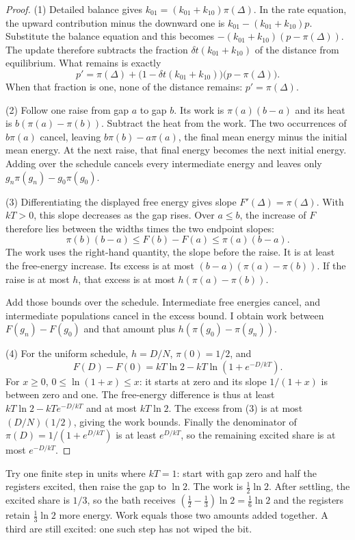 \documentclass[11pt,twoside]{article}
\theoremstyle{thielethm}
\theoremstyle{thieledef}
\theoremstyle{thieledef}
\theoremstyle{thieledef}
\theoremstyle{thielethm}
\theoremstyle{thieleobs}
\theoremstyle{thielethm}
\begin{document}
\begin{proof}
(1) Detailed balance gives
$k_{01}=(k_{01}+k_{10})\pi(\Delta)$. In the rate equation, the upward
contribution minus the downward one is
$k_{01}-(k_{01}+k_{10})p$. Substitute the balance equation and this becomes
$-(k_{01}+k_{10})(p-\pi(\Delta))$. The update therefore subtracts the
fraction $\delta t(k_{01}+k_{10})$ of the distance from equilibrium. What
remains is exactly
\[
 p'=\pi(\Delta)+\bigl(1-\delta t(k_{01}+k_{10})\bigr)
                   \bigl(p-\pi(\Delta)\bigr).
\]
When that fraction is one, none of the distance remains: $p'=\pi(\Delta)$.

(2) Follow one raise from gap $a$ to gap $b$. Its work is
$\pi(a)(b-a)$ and its heat is $b(\pi(a)-\pi(b))$. Subtract the heat from
the work. The two occurrences of $b\pi(a)$ cancel, leaving
$b\pi(b)-a\pi(a)$, the final mean energy minus the initial mean energy.
At the next raise, that final energy becomes the next initial energy.
Adding over the schedule cancels every intermediate energy and leaves
only $g_n\pi(g_n)-g_0\pi(g_0)$.

(3) Differentiating the displayed free energy gives slope $F'(\Delta)=\pi(\Delta)$.
With $kT>0$, this slope decreases as the gap rises. Over $a\le b$, the
increase of $F$ therefore lies between the widths times the two endpoint
slopes:
\[
 \pi(b)(b-a)\le F(b)-F(a)\le\pi(a)(b-a).
\]
The work uses the right-hand quantity, the slope before the raise. It is
at least the free-energy increase. Its excess is at most
$(b-a)(\pi(a)-\pi(b))$. If the raise is at most $h$, that excess is at
most $h(\pi(a)-\pi(b))$.

Add those bounds over the schedule. Intermediate free energies cancel,
and intermediate populations cancel in the excess bound. I obtain work
between $F(g_n)-F(g_0)$ and that amount plus
$h(\pi(g_0)-\pi(g_n))$.

(4) For the uniform schedule, $h=D/N$, $\pi(0)=1/2$, and
\[
 F(D)-F(0)=kT\ln2-kT\ln(1+e^{-D/kT}).
\]
For $x\ge0$, $0\le\ln(1+x)\le x$: it starts at zero and its slope
$1/(1+x)$ is between zero and one. The free-energy difference is thus
at least $kT\ln2-kT e^{-D/kT}$ and at most $kT\ln2$.
The excess from (3) is at most $(D/N)(1/2)$, giving the work bounds.
Finally the denominator of $\pi(D)=1/(1+e^{D/kT})$ is at least
$e^{D/kT}$, so the remaining excited share is at most $e^{-D/kT}$.
\end{proof}

Try one finite step in units where $kT=1$: start with gap zero and half the
registers excited, then raise the gap to $\ln2$. The work is $\tfrac12\ln2$.
After settling, the excited share is $1/3$, so the bath receives
$(\tfrac12-\tfrac13)\ln2=\tfrac16\ln2$ and the registers retain
$\tfrac13\ln2$ more energy. Work equals those two amounts added together.
A third are still excited: one such step has not wiped the bit.
\end{document}
